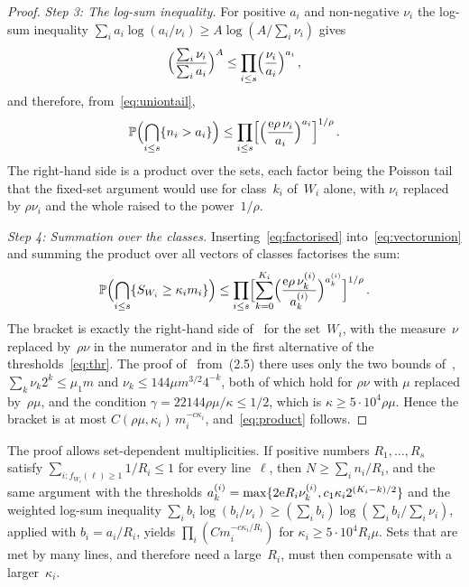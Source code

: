 \documentclass[11pt,letterpaper]{article}
\begin{document}
\begin{proof}
\emph{Step 3: The log-sum inequality.} For positive $a_i$ and non-negative $\nu_i$ the log-sum inequality $\sum_ia_i\log(a_i/\nu_i)\ge A\log(A/\sum_i\nu_i)$ gives
\begin{equation*}
  \Bigl(\frac{\sum_i\nu_i}{\sum_ia_i}\Bigr)^{A}\le\prod_{i\le s}\Bigl(\frac{\nu_i}{a_i}\Bigr)^{a_i}\,,
\end{equation*}
and therefore, from~\eqref{eq:uniontail},
\begin{equation}
\label{eq:factorised}
  \mathbb P\Bigl(\bigcap_{i\le s}\{n_i>a_i\}\Bigr)\le\prod_{i\le s}\Bigl[\Bigl(\frac{\mathrm{e}\rho\,\nu_i}{a_i}\Bigr)^{a_i}\Bigr]^{1/\rho}\,.
\end{equation}
The right-hand side is a product over the sets, each factor being the Poisson tail that the fixed-set argument would use for class~$k_i$ of~$W_i$ alone, with $\nu_i$ replaced by $\rho\nu_i$ and the whole raised to the power~$1/\rho$.

\emph{Step 4: Summation over the classes.} Inserting~\eqref{eq:factorised} into~\eqref{eq:vectorunion} and summing the product over all vectors of classes factorises the sum:
\begin{equation*}
  \mathbb P\Bigl(\bigcap_{i\le s}\{S_{W_i}\ge\kappa_im_i\}\Bigr)\le\prod_{i\le s}\Bigl[\sum_{k=0}^{K_i}\Bigl(\frac{\mathrm{e}\rho\,\nu^{(i)}_k}{a^{(i)}_k}\Bigr)^{a^{(i)}_k}\Bigr]^{1/\rho}\,.
\end{equation*}
The bracket is exactly the right-hand side of~\cite[(2.5)]{SC26} for the set~$W_i$, with the measure~$\nu$ replaced by~$\rho\nu$ in the numerator and in the first alternative of the thresholds~\eqref{eq:thr}. The proof of~\cite[Theorem~2.1]{SC26} from~(2.5) there uses only the two bounds of~\cite[Lemma~2.2]{SC26}, $\sum_k\nu_k2^k\le\mu_1m$ and $\nu_k\le144\mu m^{3/2}4^{-k}$, both of which hold for $\rho\nu$ with $\mu$ replaced by~$\rho\mu$, and the condition $\gamma=22144\rho\mu/\kappa\le1/2$, which is $\kappa\ge5\cdot10^4\rho\mu$. Hence the bracket is at most $C(\rho\mu,\kappa_i)\,m_i^{-c\kappa_i}$, and~\eqref{eq:product} follows.
\end{proof}

\begin{remark}
\label{rem:weights}
The proof allows set-dependent multiplicities. If positive numbers $R_1,\dots,R_s$ satisfy $\sum_{i\colon f_{W_i}(\ell)\ge1}1/R_i\le1$ for every line~$\ell$, then $N\ge\sum_in_i/R_i$, and the same argument with the thresholds $a^{(i)}_k=\max\{2\mathrm{e} R_i\nu^{(i)}_k,c_1\kappa_i2^{(K_i-k)/2}\}$ and the weighted log-sum inequality $\sum_ib_i\log(b_i/\nu_i)\ge(\sum_ib_i)\log(\sum_ib_i/\sum_i\nu_i)$, applied with $b_i=a_i/R_i$, yields $\prod_i(Cm_i^{-c\kappa_i/R_i})$ for $\kappa_i\ge5\cdot10^4R_i\mu$. Sets that are met by many lines, and therefore need a large~$R_i$, must then compensate with a larger~$\kappa_i$.
\end{remark}
\end{document}
